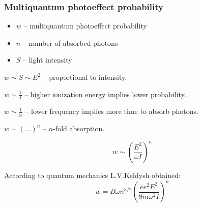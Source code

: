 \documentclass{beamer}
\begin{document}
	\begin{frame}
		\frametitle{Multiquantum photoeffect probability}
		\begin{itemize}
			\setlength\itemsep{-2pt}
			\item $w$ -- multiquantum photoeffect probability
			\item $n$ -- number of absorbed photons
			\item $S$ -- light intensity
		\end{itemize}
		
		$w \sim S \sim E^2$ -- proportional to intensity.

		$w \sim \frac{1}{I}$ -- higher ionization energy implies lower probability.
		
		$w \sim \frac{1}{\omega}$ -- lower frequency implies more time to absorb photons.
		
		$w \sim (...)^n$ -- $n$-fold absorption.
		
		$$ w \sim \left(\frac{E^2}{\omega I}\right)^n$$
		
		According to quantum mechanics L.V.Keldysh obtained:
		\begin{equation}
			w = B \omega n^{3/2} \left(\frac{\overline{e} e^2 E^2}{8m \omega^2 I}\right)^n
		\end{equation}
		
	\end{frame}
	
\end{document}
